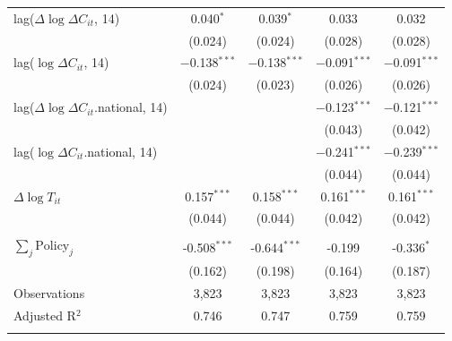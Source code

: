 \documentclass{beamer}
\def\pcolor{\color{blue}}
\def\icolor{\color{magenta}}
\begin{document}
\begin{frame}
\begin{table}[!htbp]
\begin{minipage}{\linewidth}
{\begin{tabular}{@{\extracolsep{1pt}}lcccc}
  lag($\Delta \log \Delta C_{it}$, 14) & 0.040$^{*}$ & 0.039$^{*}$ & 0.033 & 0.032 \\ 
  & (0.024) & (0.024) & (0.028) & (0.028) \\ 
{\icolor lag($\log \Delta C_{it}$, 14)} &{\icolor  $-$0.138$^{***}$} &{\icolor $-$0.138$^{***}$} & {\icolor $-$0.091$^{***}$} &{\icolor  $-$0.091$^{***}$} \\ 
  & (0.024) & (0.023) & (0.026) & (0.026) \\ 
  lag($\Delta \log \Delta C_{it}$.national, 14) &  &  & $-$0.123$^{***}$ & $-$0.121$^{***}$ \\ 
  &  &  & (0.043) & (0.042) \\ 
  lag($\log \Delta C_{it}$.national, 14) &  &  & $-$0.241$^{***}$ & $-$0.239$^{***}$ \\ 
  &  &  & (0.044) & (0.044) \\ 
  $\Delta \log T_{it}$ & 0.157$^{***}$ & 0.158$^{***}$ & 0.161$^{***}$ & 0.161$^{***}$ \\ 
  & (0.044) & (0.044) & (0.042) & (0.042) \\ 
 \hline \\[-1.8ex] 
{\pcolor $\sum_j \mathrm{Policy}_j$} & {\pcolor -0.508$^{***}$} &{\pcolor  -0.644$^{***}$} &{\pcolor -0.199} & {\pcolor -0.336$^{*}$ }\\ 
 & (0.162) & (0.198) & (0.164) & (0.187) \\ 
Observations & 3,823 & 3,823 & 3,823 & 3,823 \\ 
Adjusted R$^{2}$ & 0.746 & 0.747 & 0.759 & 0.759 \\ 
\hline 
\hline \\[-1.8ex] 

\end{tabular}}
\end{minipage}
\end{table}
\end{frame}
\end{document}
